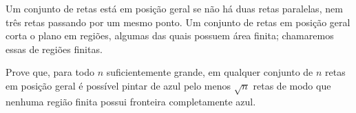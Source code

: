 Um conjunto de retas está em posição geral se não há duas retas paralelas, nem três retas passando por um mesmo ponto.
Um conjunto de retas em posição geral corta o plano em regiões, algumas das quais possuem área finita; chamaremos essas de regiões finitas.

Prove que, para todo $n$ suficientemente grande, em qualquer conjunto de $n$ retas em posição geral é possível pintar de azul pelo menos $\sqrt{n}$ retas de modo que nenhuma região finita possui fronteira completamente azul.

